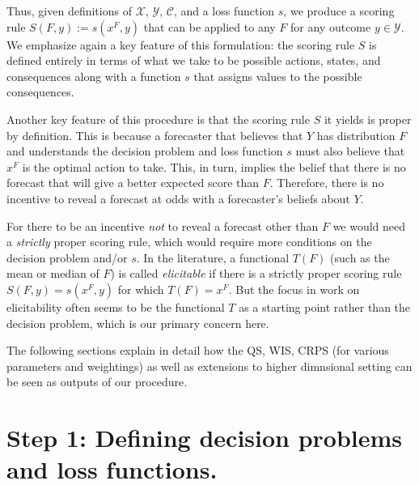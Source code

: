 \documentclass{article}
\begin{document}
Thus, given definitions of $\mathcal{X}$, $\mathcal{Y}$, $\mathcal{C}$, and a loss function $s$, we produce a scoring rule $S(F,y):= s(x^F,y)$ that can be applied to any $F$ for any outcome $y \in \mathcal{Y}$.  We emphasize again a key feature of this formulation: the scoring rule $S$ is defined entirely in terms of what we take to be possible actions, states, and consequences along with a function $s$ that assigns values to the possible consequences.

Another key feature of this procedure is that the scoring rule $S$ it yields is proper by definition.  This is because a forecaster that believes that $Y$ has distribution $F$ and understands the decision problem and loss function $s$ must also believe that $x^F$ is the optimal action to take.  This, in turn, implies the belief that there is no forecast that will give a better expected score than $F$.  Therefore, there is no incentive to reveal a forecast at odds with a forecaster's beliefs about $Y$.  

\begin{remark} For there to be an incentive \emph{not} to reveal a forecast other than $F$ we would need a \emph{strictly} proper scoring rule, which would require more conditions on the decision problem and/or $s$. In the literature, a functional $T(F)$ (such as the mean or median of $F$) is called \emph{elicitable} if there is a strictly proper scoring rule $S(F,y) = s(x^F,y)$ for which $T(F)=x^F$.  But the focus in work on elicitability often seems to be the functional $T$ as a starting point rather than the decision problem, which is our primary concern here.
\end{remark}

The following sections explain in detail how the QS, WIS, CRPS (for various parameters and weightings) as well as extensions to higher dimnsional setting can be seen as outputs of our procedure. 

\section{Step 1: Defining decision problems and loss functions.}
\end{document}

